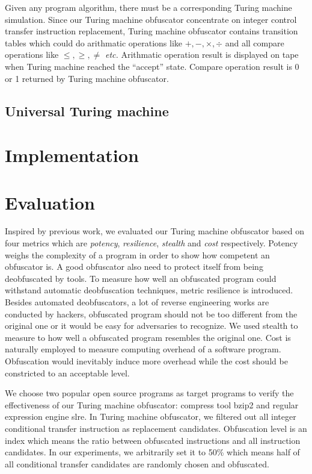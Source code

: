 \documentclass[lnicst]{svmultln}
\begin{document}
Given any program algorithm, there must be a corresponding Turing machine simulation. Since our Turing machine obfuscator concentrate on integer control transfer instruction replacement, Turing machine obfuscator contains transition tables which could do arithmatic operations like \(+, -, \times, \div\) and all compare operations like \(\leq,\geq , \neq\) \textit{etc.} Arithmatic operation result is displayed on tape when Turing machine reached the ``accept'' state. Compare operation result is 0 or 1 returned by Turing machine obfuscator.
\subsection{Universal Turing machine}

\section{Implementation}

\section{Evaluation}
Inspired by previous work\cite{Collberg}, we evaluated our Turing machine obfuscator based on four metrics which are \textit{potency}, \textit{resilience}, \textit{stealth} and \textit{cost} respectively. Potency weighs the complexity of a program in order to show how competent an obfuscator is. A good obfuscator also need to protect itself from being deobfuscated by tools. To measure how well an obfuscated program could withstand automatic deobfuscation techniques, metric resilience is introduced. Besides automated deobfuscators, a lot of reverse engineering works are conducted by hackers, obfuscated program should not be too different from the original one or it would be easy for adversaries to recognize. We used stealth to measure to how well a obfuscated program resembles the original one. Cost is naturally employed to measure computing overhead of a software program. Obfuscation would inevitably induce more overhead while the cost should be constricted to an acceptable level.

We choose two popular open source programs as target programs to verify the effectiveness of our Turing machine obfuscator: compress tool bzip2\cite{bzip2} and regular expression engine slre\cite{slre}. In Turing machine obfuscator, we filtered out all integer conditional transfer instruction as replacement candidates. Obfuscation level is an index which means the ratio between obfuscated instructions and all instruction candidates. In our experiments, we arbitrarily set it to 50\% which means half of all conditional transfer candidates are randomly chosen and obfuscated.
\end{document}
